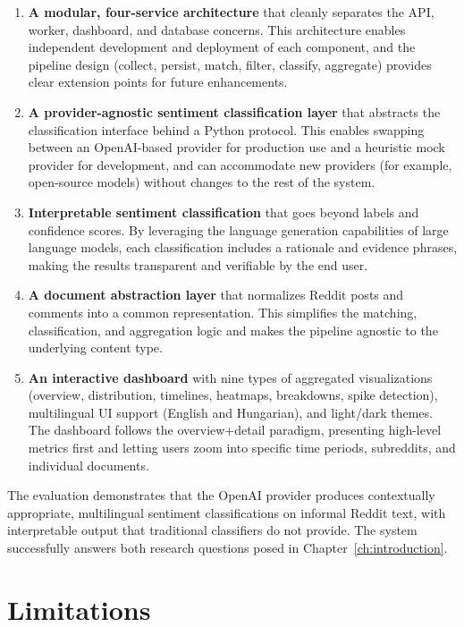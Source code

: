 \begin{enumerate}
    \item \textbf{A modular, four-service architecture} that cleanly separates the API, worker, dashboard, and database concerns. This architecture enables independent development and deployment of each component, and the pipeline design (collect, persist, match, filter, classify, aggregate) provides clear extension points for future enhancements.

    \item \textbf{A provider-agnostic sentiment classification layer} that abstracts the classification interface behind a Python protocol. This enables swapping between an OpenAI-based provider for production use and a heuristic mock provider for development, and can accommodate new providers (for example, open-source models) without changes to the rest of the system.

    \item \textbf{Interpretable sentiment classification} that goes beyond labels and confidence scores. By leveraging the language generation capabilities of large language models, each classification includes a rationale and evidence phrases, making the results transparent and verifiable by the end user.

    \item \textbf{A document abstraction layer} that normalizes Reddit posts and comments into a common representation. This simplifies the matching, classification, and aggregation logic and makes the pipeline agnostic to the underlying content type.

    \item \textbf{An interactive dashboard} with nine types of aggregated visualizations (overview, distribution, timelines, heatmaps, breakdowns, spike detection), multilingual UI support (English and Hungarian), and light/dark themes. The dashboard follows the overview+detail paradigm, presenting high-level metrics first and letting users zoom into specific time periods, subreddits, and individual documents.
\end{enumerate}

The evaluation demonstrates that the OpenAI provider produces contextually appropriate, multilingual sentiment classifications on informal Reddit text, with interpretable output that traditional classifiers do not provide. The system successfully answers both research questions posed in Chapter~\ref{ch:introduction}.

\section{Limitations}
\label{sec:limitations}

